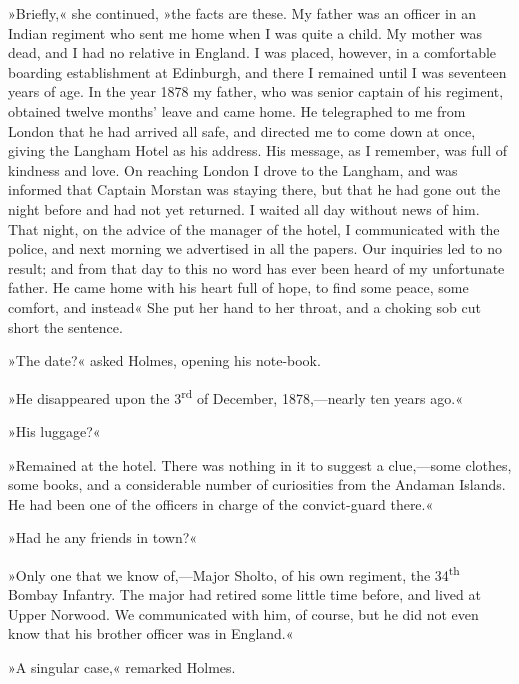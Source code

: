 »Briefly,« she continued, »the facts are these. My father was an officer in an Indian regiment who sent me home when I was quite a child. My mother was dead, and I had no relative in England. I was placed, however, in a comfortable boarding establishment at Edinburgh, and there I remained until I was seventeen years of age. In the year 1878 my father, who was senior captain of his regiment, obtained twelve months' leave and came home. He telegraphed to me from London that he had arrived all safe, and directed me to come down at once, giving the Langham Hotel as his address. His message, as I remember, was full of kindness and love. On reaching London I drove to the Langham, and was informed that Captain Morstan was staying there, but that he had gone out the night before and had not yet returned. I waited all day without news of him. That night, on the advice of the manager of the hotel, I communicated with the police, and next morning we advertised in all the papers. Our inquiries led to no result; and from that day to this no word has ever been heard of my unfortunate father. He came home with his heart full of hope, to find some peace, some comfort, and instead\longdash« She put her hand to her throat, and a choking sob cut short the sentence.

»The date?« asked Holmes, opening his note-book.

»He disappeared upon the 3\textsuperscript{rd} of December, 1878,—nearly ten years ago.«

»His luggage?«

»Remained at the hotel. There was nothing in it to suggest a clue,—some clothes, some books, and a considerable number of curiosities from the Andaman Islands. He had been one of the officers in charge of the convict-guard there.«

»Had he any friends in town?«

»Only one that we know of,—Major Sholto, of his own regiment, the 34\textsuperscript{th} Bombay Infantry. The major had retired some little time before, and lived at Upper Norwood. We communicated with him, of course, but he did not even know that his brother officer was in England.«

»A singular case,« remarked Holmes.

